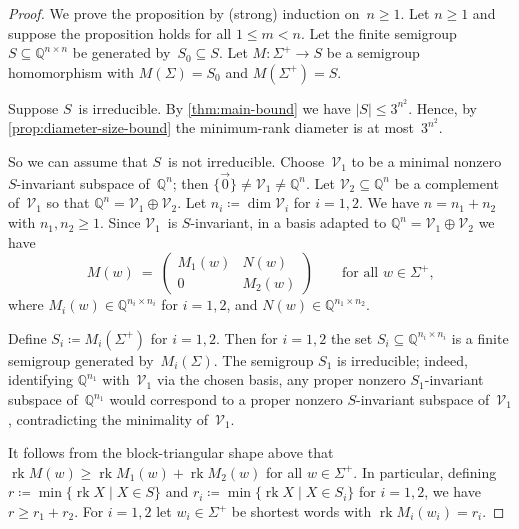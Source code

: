 \documentclass[10pt,a4paper]{amsart}
\newcommand{\Q}{\mathbb{Q}}
\newcommand{\V}{\mathcal{V}}
\newcommand{\rk}{\operatorname{rk}}
\begin{document}
\begin{proof}
We prove the proposition by (strong) induction on~$n \ge 1$.
Let $n \ge 1$ and suppose the proposition holds for all $1 \le m < n$.
Let the finite semigroup $S \subseteq \Q^{n \times n}$ be generated by~$S_0 \subseteq S$.
Let $M : \Sigma^+ \to S$ be a semigroup homomorphism with $M(\Sigma) = S_0$ and $M(\Sigma^+) = S$.

Suppose $S$~is irreducible.
By \cref{thm:main-bound} we have $|S| \le 3^{n^2}$.
Hence, by \cref{prop:diameter-size-bound} the minimum-rank diameter is at most~$3^{n^2}$.

So we can assume that $S$~is not irreducible.
Choose~$\V_1$ to be a minimal nonzero $S$-invariant subspace of~$\Q^n$; then $\{\vec{0}\} \ne \V_1 \ne \Q^n$.
Let $\V_2 \subseteq \Q^n$ be a complement of~$\V_1$ so that $\Q^n = \V_1 \oplus \V_2$.
Let $n_i \coloneqq \dim \V_i$ for $i=1,2$.
We have $n = n_1 + n_2$ with $n_1,n_2 \ge 1$.
Since $\V_1$~is $S$-invariant, in a basis adapted to $\Q^n = \V_1 \oplus \V_2$ we have
\[
M(w) \ = \ \begin{pmatrix} M_1(w) & N(w) \\ 0 & M_2(w) \end{pmatrix} \qquad \text{for all $w \in \Sigma^+$,}
\]
where $M_i(w) \in \Q^{n_i \times n_i}$ for $i = 1,2$, and $N(w) \in \Q^{n_1 \times n_2}$.

Define $S_i \coloneqq M_i(\Sigma^+)$ for $i=1,2$.
Then for $i=1,2$ the set $S_i \subseteq \Q^{n_i \times n_i}$ is a finite semigroup generated by~$M_i(\Sigma)$.
The semigroup $S_1$ is irreducible; indeed, identifying $\Q^{n_1}$ with~$\V_1$ via the chosen basis, any proper nonzero $S_1$-invariant subspace of~$\Q^{n_1}$ would correspond to a proper nonzero $S$-invariant subspace of~$\V_1$, contradicting the minimality of~$\V_1$.

It follows from the block-triangular shape above that $\rk M(w) \ge \rk M_1(w) + \rk M_2(w)$ for all $w \in \Sigma^+$.
In particular, defining $r \coloneqq \min\{\rk X \mid X \in S\}$ and $r_i \coloneqq \min\{\rk X \mid X \in S_i\}$ for $i=1,2$, we have $r \ge r_1 + r_2$.
For $i=1,2$ let $w_i \in \Sigma^+$ be shortest words with $\rk M_i(w_i) = r_i$.


\end{proof}
\end{document}
